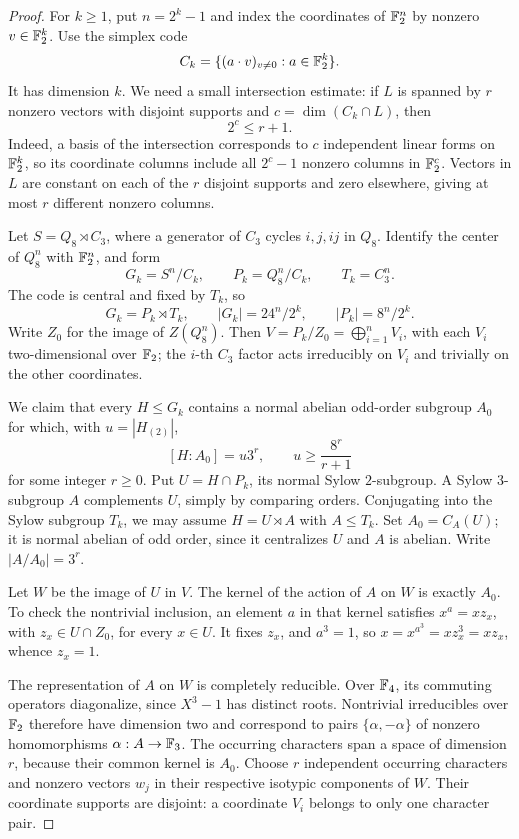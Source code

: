 \begin{proof}
For \(k\geq1\), put \(n=2^k-1\) and index the coordinates of
\(\mathbb F_2^n\) by nonzero \(v\in\mathbb F_2^k\). Use the simplex code
\[
 C_k=\{(a\cdot v)_{v\ne0}:a\in\mathbb F_2^k\}.
\]
It has dimension \(k\). We need a small intersection estimate:
if \(L\) is spanned by \(r\) nonzero vectors with disjoint supports
and \(c=\dim(C_k\cap L)\), then
\begin{equation}\label{eq:simplex-intersection}
 2^c\leq r+1.
\end{equation}
Indeed, a basis of the intersection corresponds to \(c\) independent
linear forms on \(\mathbb F_2^k\), so its coordinate columns include all
\(2^c-1\) nonzero columns in \(\mathbb F_2^c\). Vectors in \(L\) are
constant on each of the \(r\) disjoint supports and zero elsewhere,
giving at most \(r\) different nonzero columns.

Let \(S=Q_8\rtimes C_3\), where a generator of \(C_3\) cycles
\(i,j,ij\) in \(Q_8\). Identify the center of \(Q_8^n\) with
\(\mathbb F_2^n\), and form
\[
 G_k=S^n/C_k,\qquad P_k=Q_8^n/C_k,\qquad T_k=C_3^n.
\]
The code is central and fixed by \(T_k\), so
\[
 G_k=P_k\rtimes T_k,\qquad
 |G_k|=24^n/2^k,\qquad |P_k|=8^n/2^k.
\]
Write \(Z_0\) for the image of \(Z(Q_8^n)\). Then
\(V=P_k/Z_0=\bigoplus_{i=1}^n V_i\), with each \(V_i\)
two-dimensional over \(\mathbb F_2\); the \(i\)-th \(C_3\) factor acts
irreducibly on \(V_i\) and trivially on the other coordinates.

We claim that every \(H\leq G_k\) contains a normal abelian
odd-order subgroup \(A_0\) for which, with \(u=|H_{(2)}|\),
\begin{equation}\label{eq:jordan-subgroup}
 [H:A_0]=u3^r,\qquad u\geq\frac{8^r}{r+1}
\end{equation}
for some integer \(r\geq0\).
Put \(U=H\cap P_k\), its normal Sylow \(2\)-subgroup. A Sylow
\(3\)-subgroup \(A\) complements \(U\), simply by comparing
orders. Conjugating into the Sylow subgroup \(T_k\), we may assume
\(H=U\rtimes A\) with \(A\leq T_k\). Set \(A_0=C_A(U)\);
it is normal abelian of odd order, since it centralizes \(U\)
and \(A\) is abelian. Write \(|A/A_0|=3^r\).

Let \(W\) be the image of \(U\) in \(V\). The kernel of the
action of \(A\) on \(W\) is exactly \(A_0\). To check the
nontrivial inclusion, an element \(a\) in that kernel satisfies
\(x^a=xz_x\), with \(z_x\in U\cap Z_0\), for every \(x\in U\).
It fixes \(z_x\), and \(a^3=1\), so
\(x=x^{a^3}=xz_x^3=xz_x\), whence \(z_x=1\).

The representation of \(A\) on \(W\) is completely reducible.
Over \(\mathbb F_4\), its commuting operators diagonalize, since
\(X^3-1\) has distinct roots. Nontrivial irreducibles over
\(\mathbb F_2\) therefore have dimension two and correspond to pairs
\(\{\alpha,-\alpha\}\) of nonzero homomorphisms
\(\alpha:A\to\mathbb F_3\). The occurring characters span a space of
dimension \(r\), because their common kernel is \(A_0\).
Choose \(r\) independent occurring characters and nonzero vectors
\(w_j\) in their respective isotypic components of \(W\).
Their coordinate supports are disjoint: a coordinate \(V_i\)
belongs to only one character pair.


\end{proof}
